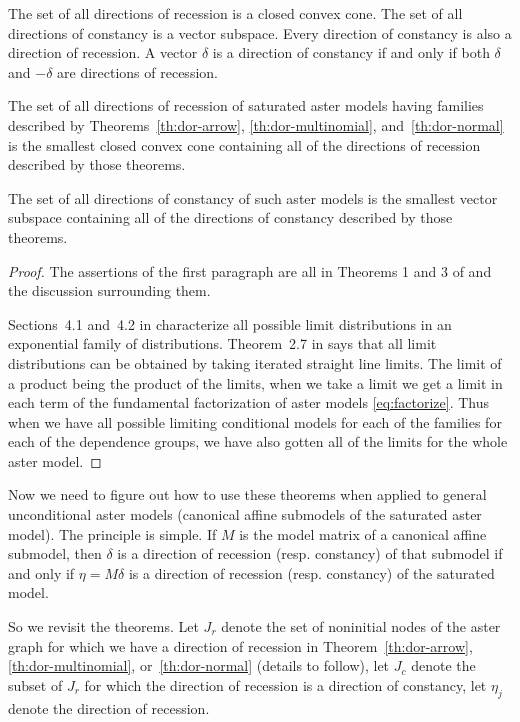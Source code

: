 \begin{theorem} \label{th:dor-aster}
The set of all directions of recession is a closed convex cone.
The set of all directions of constancy is a vector subspace.
Every direction of constancy is also a direction of recession.
A vector $\delta$ is a direction of constancy if and only if
both $\delta$ and $- \delta$ are directions of recession.

The set of all directions of recession of saturated aster models
having families described by Theorems~\ref{th:dor-arrow},
\ref{th:dor-multinomial}, and~\ref{th:dor-normal}
is the smallest closed convex cone containing all of the directions
of recession described by those theorems.

The set of all directions of constancy of such aster models
is the smallest vector subspace containing all of the directions
of constancy described by those theorems.
\end{theorem}
\begin{proof}
The assertions of the first paragraph are all in Theorems 1 and 3 of
\citet{geyer-gdor} and the discussion surrounding them.

Sections~4.1 and~{4.2} in \citet{geyer-thesis} characterize all possible
limit distributions in an exponential family of distributions.
Theorem~{2.7} in \citet{geyer-thesis} says that all limit distributions
can be obtained by taking iterated straight line limits.
The limit of a product being the product of the limits, when we take a
limit we get a limit in each term of the fundamental factorization of
aster models \eqref{eq:factorize}.
Thus when we have all possible limiting conditional models for each of
the families for each of the dependence groups, we have also gotten
all of the limits for the whole aster model.
\end{proof}

Now we need to figure out how to use these theorems when applied to
general unconditional aster models (canonical affine submodels of
the saturated aster model).  The principle is simple.  If $M$ is the
model matrix of a canonical affine submodel, then $\delta$ is a direction
of recession (resp\@. constancy) of that submodel if and only
if $\eta = M \delta$ is a direction of recession (resp\@. constancy)
of the saturated model.

So we revisit the theorems.
Let $J_r$ denote the set of noninitial nodes of the aster graph for
which we have a direction of recession in
Theorem~\ref{th:dor-arrow}, \ref{th:dor-multinomial}, or~\ref{th:dor-normal}
(details to follow),
let $J_c$ denote the subset of $J_r$ for which the direction of recession
is a direction of constancy,
let $\eta_j$ denote the direction of recession.


